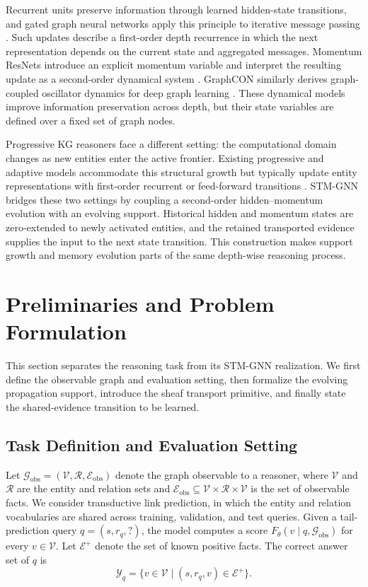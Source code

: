 \documentclass[a4paper,fleqn]{cas-sc}
\begin{document}
Recurrent units preserve information through learned hidden-state transitions,
and gated graph neural networks apply this principle to iterative message
passing \citep{cho2014learning,li2016gated}. Such updates describe a first-order
depth recurrence in which the next representation depends on the current state
and aggregated messages. Momentum ResNets introduce an explicit momentum
variable and interpret the resulting update as a second-order dynamical system
\citep{sander2021momentum}. GraphCON similarly derives graph-coupled oscillator
dynamics for deep graph learning \citep{rusch2022graphcon}. These dynamical
models improve information preservation across depth, but their state variables
are defined over a fixed set of graph nodes.

Progressive KG reasoners face a different setting: the computational domain
changes as new entities enter the active frontier. Existing progressive and
adaptive models accommodate this structural growth but typically update entity
representations with first-order recurrent or feed-forward transitions
\citep{zhang2022knowledge,zhang2022adaprop}. STM-GNN bridges these two settings
by coupling a second-order hidden--momentum evolution with an evolving support.
Historical hidden and momentum states are zero-extended to newly activated
entities, and the retained transported evidence supplies the input to the next
state transition. This construction makes support growth and memory evolution
parts of the same depth-wise reasoning process.

\section{Preliminaries and Problem Formulation}\label{sec:preliminaries}

This section separates the reasoning task from its STM-GNN realization. We
first define the observable graph and evaluation setting, then formalize the
evolving propagation support, introduce the sheaf transport primitive, and
finally state the shared-evidence transition to be learned.

\subsection{Task Definition and Evaluation Setting}
\label{subsec:problem_definition}

Let
$\mathcal{G}_{\mathrm{obs}}=(\mathcal{V},\mathcal{R},
\mathcal{E}_{\mathrm{obs}})$ denote the graph observable to a reasoner, where
$\mathcal{V}$ and $\mathcal{R}$ are the entity and relation sets and
$\mathcal{E}_{\mathrm{obs}}\subseteq
\mathcal{V}\times\mathcal{R}\times\mathcal{V}$ is the set of observable
facts. We consider transductive link prediction, in which the entity and
relation vocabularies are shared across training, validation, and test queries.
Given a tail-prediction query $q=(s,r_q,?)$, the model computes a score
$F_\theta(v\mid q,\mathcal{G}_{\mathrm{obs}})$ for every
$v\in\mathcal{V}$. Let $\mathcal{E}^{+}$ denote the set of known positive
facts. The correct answer set of $q$ is
\begin{equation}
\mathcal{Y}_{q}
=
\{v\in\mathcal{V}\mid(s,r_q,v)\in\mathcal{E}^{+}\}.
\end{equation}
\end{document}
